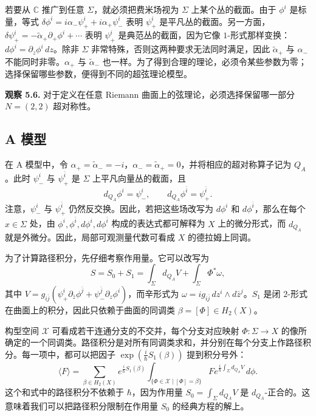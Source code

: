 若要从 $\mathbb C$ 推广到任意 $\Sigma$，就必须把费米场视为 $\Sigma$ 上某个丛的截面。由于 $\phi^i$ 是标量，等式 $\delta\phi^i=i\alpha_-\psi^i_++i\alpha_+\psi^i_-$ 表明 $\psi^i_+$ 是平凡丛的截面。另一方面，$\delta\psi^i_+=-\widetilde\alpha_+\partial_+\phi^i+\cdots$ 表明 $\psi^i_+$ 是典范丛的截面，因为它像 $1$-形式那样变换：$d\phi^i=\partial_z\phi^i\,dz$。除非 $\Sigma$ 非常特殊，否则这两种要求无法同时满足，因此 $\widetilde\alpha_+$ 与 $\alpha_-$ 不能同时非零。$\alpha_+$ 与 $\widetilde\alpha_-$ 也一样。为了得到合理的理论，必须令某些参数为零；选择保留哪些参数，便得到不同的超弦理论模型。

\begin{note}\label{note:string-susy-choice}
\textbf{观察 5.6.} 对于定义在任意 Riemann 曲面上的弦理论，必须选择保留哪一部分 $N=(2,2)$ 超对称性。
\end{note}

\subsection{A 模型}
在 A 模型中，令 $\alpha_+=\widetilde\alpha_-=-i$，$\alpha_-=\widetilde\alpha_+=0$，并将相应的超对称算子记为 $Q_A$。此时 $\psi^i_-$ 与 $\psi^{\bar i}_+$ 是 $\Sigma$ 上平凡向量丛的截面，且
\[
  d_{Q_A}\phi^i=\psi^i_-,\qquad d_{Q_A}\phi^{\bar i}=\psi^{\bar i}_+.
\]
注意，$\psi^i_-$ 与 $\psi^{\bar i}_+$ 仍然反交换。因此，若把这些场改写为 $d\phi^i$ 和 $d\phi^{\bar i}$，那么在每个 $x\in\Sigma$ 处，由 $\phi^i,\phi^{\bar i},d\phi^i,d\phi^{\bar i}$ 构成的表达式都可解释为 $X$ 上的微分形式，而 $d_{Q_A}$ 就是外微分。因此，局部可观测量代数可看成 $X$ 的德拉姆上同调。

为了计算路径积分，先仔细考察作用量。它可以改写为
\[
  S=S_0+S_1=\int_\Sigma d_{Q_A}V+\int_\Sigma\Phi^*\omega,
\]
其中 $V=g_{i\bar j}(\psi^i_+\partial_{\bar z}\phi^{\bar j}
 +\psi^{\bar j}_-\partial_z\phi^i)$，而辛形式为 $\omega=i g_{i\bar j}\,dz^i\wedge d\bar z^j$。$S_1$ 是闭 $2$-形式在曲面上的积分，因此只依赖于曲面的同调类 $\beta=[\Phi]\in H_2(X)$。

构型空间 $\mathcal X$ 可看成若干连通分支的不交并，每个分支对应映射 $\Phi\colon\Sigma\to X$ 的像所确定的一个同调类。路径积分是对所有同调类求和，并分别在每个分支上作路径积分。每一项中，都可以把因子 $\exp(\frac{i}{\hbar}S_1(\beta))$ 提到积分号外：
\[
  \langle F\rangle=
  \sum_{\beta\in H_2(X)}e^{\frac{i}{\hbar}S_1(\beta)}
  \int_{\{\Phi\in\mathcal X\mid[\Phi]=\beta\}}
       Fe^{\frac{i}{\hbar}\int_\Sigma d_{Q_A}V}\,d\phi.
\]
这个和式中的路径积分不依赖于 $\hbar$，因为作用量 $S_0=\int_\Sigma d_{Q_A}V$ 是 $d_{Q_A}$-正合的。这意味着我们可以把路径积分限制在作用量 $S_0$ 的经典方程的解上。

